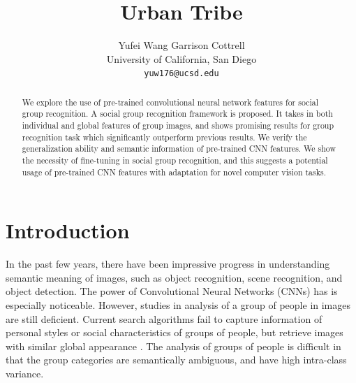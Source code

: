 \documentclass[10pt,twocolumn,letterpaper]{article}
\begin{document}
\title{Urban Tribe}

\author{Yufei Wang \hspace{2cm}  Garrison Cottrell \\
University of California, San Diego\\
{\tt\small yuw176@ucsd.edu}
}

\maketitle
\ifwacvfinal\thispagestyle{empty}\fi

\begin{abstract}
We explore the use of pre-trained convolutional neural network features for social group recognition. A social group recognition framework is proposed. It takes in both individual and global features of group images, and shows promising results  for group recognition task which significantly outperform previous results. We verify the generalization ability and semantic information of pre-trained CNN features. We show the necessity of  fine-tuning in social group recognition, and this suggests a potential usage of pre-trained CNN features with adaptation for novel computer vision tasks. 

\end{abstract}

\section{Introduction}

{I}{n} the past few years, there have been impressive progress in understanding semantic meaning of images, such as object recognition, scene recognition, and object detection. The power of Convolutional Neural Networks (CNNs) has is especially noticeable. However, studies in analysis of a group of people in images are still deficient. Current search algorithms fail to capture information of personal styles or social characteristics of groups of people, but retrieve images with similar global appearance \cite{urbantribe2}. The analysis of groups of people is difficult in that the group categories are semantically ambiguous, and have high intra-class variance.
\end{document}

